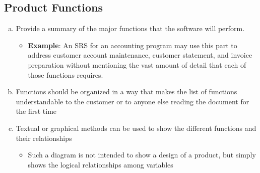 \documentclass[titlepage]{article}
\begin{document}
		\subsection{Product Functions}
		\label{sub:product_functions}
		\begin{enumerate}[a)]
			\item Provide a summary of the major functions that the software will perform.
			\begin{itemize}
				\item \textbf{Example}: An SRS for an accounting program may use this part to address customer account maintenance, customer statement, and invoice preparation without mentioning the vast amount of detail that each of those functions requires.
			\end{itemize}
			\item Functions should be organized in a way that makes the list of functions understandable to the customer or to anyone else reading the document for the first time
			\item Textual or graphical methods can be used to show the different functions and their relationships
			\begin{itemize}
				\item Such a diagram is not intended to show a design of a product, but simply shows the logical relationships among variables
			\end{itemize} 
		\end{enumerate}
		
\end{document}
